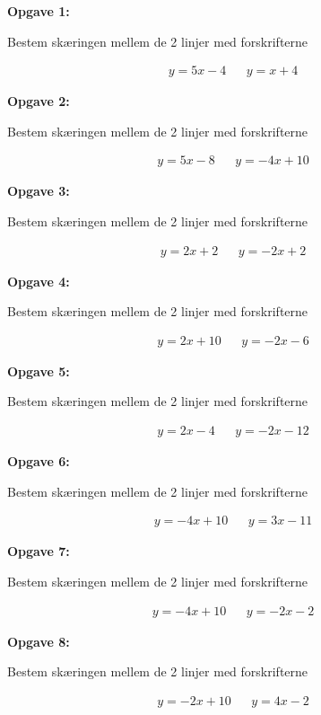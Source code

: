 \textbf{Opgave 1:}

Bestem skæringen mellem de 2 linjer med forskrifterne 

\begin{align*}
y = 5x - 4 &&  y = x + 4
\end{align*}

\textbf{Opgave 2:}

Bestem skæringen mellem de 2 linjer med forskrifterne 

\begin{align*}
y =  5x-8 &&  y = -4x + 10
\end{align*}

\textbf{Opgave 3:}

Bestem skæringen mellem de 2 linjer med forskrifterne 

\begin{align*}
y = 2x + 2 &&  y = -2x + 2
\end{align*}

\textbf{Opgave 4:}

Bestem skæringen mellem de 2 linjer med forskrifterne 

\begin{align*}
y = 2x + 10 &&  y = -2x - 6
\end{align*}

\textbf{Opgave 5:}

Bestem skæringen mellem de 2 linjer med forskrifterne 

\begin{align*}
y = 2x - 4 &&  y = -2x -12
\end{align*}

\textbf{Opgave 6:}

Bestem skæringen mellem de 2 linjer med forskrifterne 

\begin{align*}
y = -4x +10 &&  y = 3x -11
\end{align*}

\textbf{Opgave 7:}

Bestem skæringen mellem de 2 linjer med forskrifterne 

\begin{align*}
y = -4x +10 &&  y = -2x -2
\end{align*}

\textbf{Opgave 8:}

Bestem skæringen mellem de 2 linjer med forskrifterne 

\begin{align*}
y = -2x +10 &&  y = 4x -2
\end{align*}

